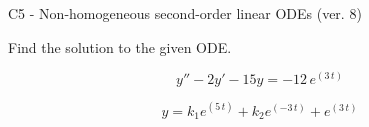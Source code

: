\begin{exercise}
  \begin{exerciseTitle}C5 - Non-homogeneous second-order linear ODEs (ver. 8)\end{exerciseTitle}
  \begin{exerciseStatement}
    
Find the solution to the given ODE.

    
\[y''-2y'-15y = -12 \, e^{\left(3 \, t\right)}\]

  \end{exerciseStatement}
  \begin{exerciseAnswer}
    
\[y= k_{1} e^{\left(5 \, t\right)} + k_{2} e^{\left(-3 \, t\right)} + e^{\left(3 \, t\right)}\]

  \end{exerciseAnswer}
\end{exercise}
